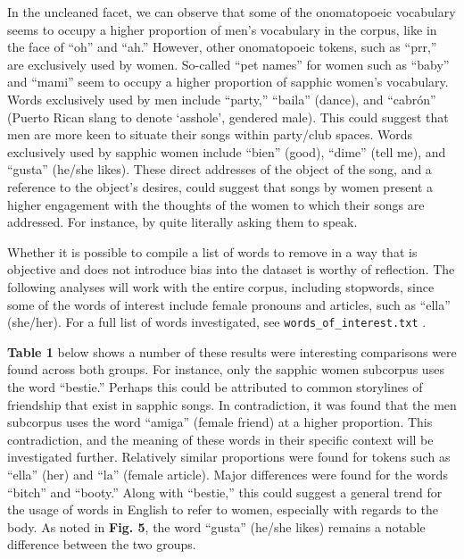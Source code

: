 \documentclass[
  letterpaper,
  DIV=11,
  numbers=noendperiod]{scrartcl}
\begin{document}
In the uncleaned facet, we can observe that some of the onomatopoeic
vocabulary seems to occupy a higher proportion of men's vocabulary in
the corpus, like in the face of ``oh'' and ``ah.'' However, other
onomatopoeic tokens, such as ``prr,'' are exclusively used by women.
So-called ``pet names'' for women such as ``baby'' and ``mami'' seem to
occupy a higher proportion of sapphic women's vocabulary. Words
exclusively used by men include ``party,'' ``baila'' (dance), and
``cabrón'' (Puerto Rican slang to denote `asshole', gendered male). This
could suggest that men are more keen to situate their songs within
party/club spaces. Words exclusively used by sapphic women include
``bien'' (good), ``dime'' (tell me), and ``gusta'' (he/she likes). These
direct addresses of the object of the song, and a reference to the
object's desires, could suggest that songs by women present a higher
engagement with the thoughts of the women to which their songs are
addressed. For instance, by quite literally asking them to speak.

Whether it is possible to compile a list of words to remove in a way
that is objective and does not introduce bias into the dataset is worthy
of reflection. The following analyses will work with the entire corpus,
including stopwords, since some of the words of interest include female
pronouns and articles, such as ``ella'' (she/her). For a full list of
words investigated, see \texttt{words\_of\_interest.txt} .

\textbf{Table 1} below shows a number of these results were interesting
comparisons were found across both groups. For instance, only the
sapphic women subcorpus uses the word ``bestie.'' Perhaps this could be
attributed to common storylines of friendship that exist in sapphic
songs. In contradiction, it was found that the men subcorpus uses the
word ``amiga'' (female friend) at a higher proportion. This
contradiction, and the meaning of these words in their specific context
will be investigated further. Relatively similar proportions were found
for tokens such as ``ella'' (her) and ``la'' (female article). Major
differences were found for the words ``bitch'' and ``booty.'' Along with
``bestie,'' this could suggest a general trend for the usage of words in
English to refer to women, especially with regards to the body. As noted
in \textbf{Fig. 5}, the word ``gusta'' (he/she likes) remains a notable
difference between the two groups.
\end{document}
